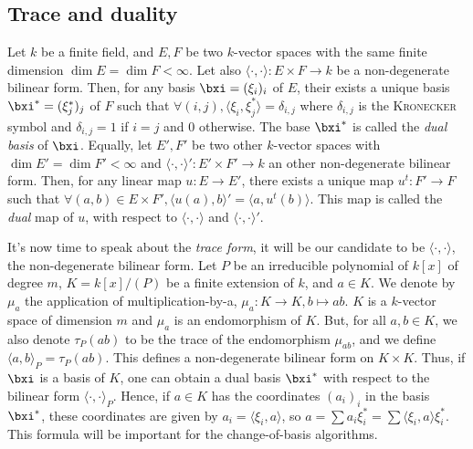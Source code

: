 \documentclass[a4paper,11pt]{article}
\theoremstyle{break}
\theoremstyle{definition}
\theoremstyle{remark}
\newcommand{\ps}[2]{\langle#1,#2\rangle}
\begin{document}
\subsection{Trace and duality}
Let $k$ be a finite field, and  $E,F$ be two $k$-vector spaces with the same
finite dimension $\dim E = \dim F < \infty$. Let also
$\ps{\cdot}{\cdot}:E\times F\rightarrow k$ be a non-degenerate bilinear form. 
Then,
for any basis $\bxi=(\xi_i)_i$ of $E$, their exists a unique basis
$\bxi^*=(\xi_j^*)_j$ of $F$
such that $\forall (i,j),\ps{\xi_i}{\xi_j^*}=\delta_{i,j}$ where $\delta_{i,j}$ 
is
the \textsc{Kronecker} symbol and $\delta_{i,j}=1$ if $i=j$ and 0 otherwise.
The base $\bxi^*$ is called the \emph{dual basis} of $\bxi$.
Equally, let $E',F'$ be two other $k$-vector spaces with $\dim E' = \dim F' <
\infty$ and $\ps{\cdot}{\cdot}':E'\times F'\rightarrow k$ an other 
non-degenerate
bilinear form. Then, for any linear map $u:E\rightarrow E'$, there exists a
unique map $u^t:F'\rightarrow F$ such that $\forall (a,b)\in E\times
F',\ps{u(a)}{b}'=\ps{a}{u^t(b)}$. This map is called the \emph{dual} map of $u$,
with respect to $\ps{\cdot}{\cdot}$ and $\ps{\cdot}{\cdot}'$.

It's now time to speak about the \emph{trace form}, it will be our candidate to 
be 
$\ps{\cdot}{\cdot}$, the non-degenerate bilinear form. Let $P$ be an irreducible
polynomial of $k[x]$ of degree $m$, $K=k[x]/(P)$ be a finite
extension of $k$, and $a\in K$. We denote by $\mu_a$ the application of
multiplication-by-a, $\mu_a:K\rightarrow K, b\mapsto ab$. $K$ is a $k$-vector
space of dimension $m$ and $\mu_a$ is an endomorphism of $K$. But, for all 
$a,b\in K$, we also denote $\tau_P(ab)$ to be the trace of the endomorphism 
$\mu_{ab}$, and we define
$\ps{a}{b}_P=\tau_P(ab)$. This defines a non-degenerate bilinear form on 
$K\times
K$. Thus, if $\bxi$ is a basis of $K$, one can obtain a dual basis $\bxi^*$ with
respect to the bilinear form $\ps{\cdot}{\cdot}_P$. Hence, if $a\in K$ has the
coordinates $(a_i)_i$ in the basis $\bxi^*$, these coordinates are given by
$a_i=\ps{\xi_i}{a}$, so $a=\sum a_i\xi_i^*=\sum\ps{\xi_i}{a}\xi_i^*$. This
formula will be important for the change-of-basis algorithms.
\end{document}
